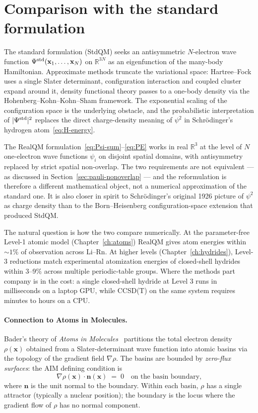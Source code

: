 \section{Comparison with the standard formulation}\label{sec:vs-stdqm}

The standard formulation (StdQM) seeks an antisymmetric $N$-electron wave function $\Psi^{\rm std}(\mathbf{x}_1, \ldots, \mathbf{x}_N)$ on $\mathbb{R}^{3N}$ as an eigenfunction of the many-body Hamiltonian. Approximate methods truncate the variational space: Hartree--Fock uses a single Slater determinant, configuration interaction and coupled cluster expand around it, density functional theory passes to a one-body density via the Hohenberg--Kohn--Kohn--Sham framework. The exponential scaling of the configuration space is the underlying obstacle, and the probabilistic interpretation of $|\Psi^{\rm std}|^2$ replaces the direct charge-density meaning of $\psi^2$ in Schr\"odinger's hydrogen atom~\eqref{eq:H-energy}.

The RealQM formulation~\eqref{eq:Psi-sum}--\eqref{eq:PE} works in real $\mathbb{R}^3$ at the level of $N$ one-electron wave functions $\psi_i$ on disjoint spatial domains, with antisymmetry replaced by strict spatial non-overlap. The two requirements are not equivalent --- as discussed in Section~\ref{sec:pauli-nonoverlap} --- and the reformulation is therefore a different mathematical object, not a numerical approximation of the standard one. It is also closer in spirit to Schr\"odinger's original 1926 picture of $\psi^2$ as charge density than to the Born--Heisenberg configuration-space extension that produced StdQM.

The natural question is how the two compare numerically. At the parameter-free Level-1 atomic model (Chapter~\ref{ch:atoms}) RealQM gives atom energies within ${\sim}1\%$ of observation across Li--Rn. At higher levels (Chapter~\ref{ch:hydrides}), Level-3 reductions match experimental atomization energies of closed-shell hydrides within 3--9\% across multiple periodic-table groups. Where the methods part company is in the cost: a single closed-shell hydride at Level 3 runs in milliseconds on a laptop GPU, while CCSD(T) on the same system requires minutes to hours on a CPU.

\paragraph{Connection to Atoms in Molecules.}
Bader's theory of \emph{Atoms in Molecules}~\cite{Bader90} partitions the total electron density $\rho(\mathbf{x})$ obtained from a Slater-determinant wave function into atomic basins via the topology of the gradient field $\nabla \rho$. The basins are bounded by \emph{zero-flux surfaces}: the AIM defining condition is
\[
\nabla \rho(\mathbf{x}) \cdot \mathbf{n}(\mathbf{x}) \;=\; 0
\quad\text{on the basin boundary,}
\]
where $\mathbf{n}$ is the unit normal to the boundary. Within each basin, $\rho$ has a single attractor (typically a nuclear position); the boundary is the locus where the gradient flow of $\rho$ has no normal component.

